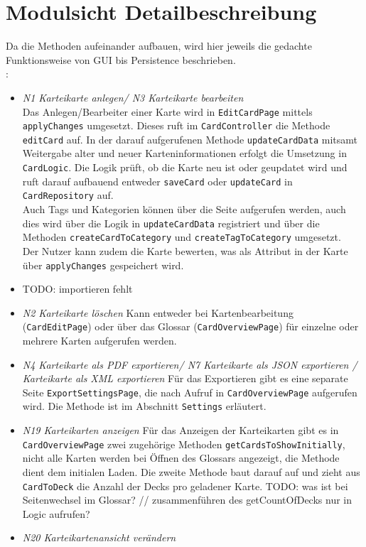 \documentclass[fontsize=12pt,paper=A4,twoside]{scrartcl}
\begin{document}
    \section{Modulsicht Detailbeschreibung}
    Da die Methoden aufeinander aufbauen, wird hier jeweils die gedachte Funktionsweise von GUI bis Persistence beschrieben.\\
    :
    \begin{itemize}
    \item \textit{N1 Karteikarte anlegen/ N3 Karteikarte bearbeiten}\\ Das Anlegen/Bearbeiter einer Karte wird in \texttt{EditCardPage} mittels \texttt{applyChanges} umgesetzt.
    Dieses ruft im \texttt{CardController} die Methode \texttt{editCard} auf. In der darauf aufgerufenen Methode
    \texttt{updateCardData} mitsamt Weitergabe alter und neuer Karteninformationen erfolgt die Umsetzung in \texttt{CardLogic}.
    Die Logik prüft, ob die Karte neu ist oder geupdatet wird und ruft darauf aufbauend entweder \texttt{saveCard} oder \texttt{updateCard}
    in \texttt{CardRepository} auf.\\
    Auch Tags und Kategorien können über die Seite aufgerufen werden, auch dies wird über die Logik in \texttt{updateCardData} registriert und über die Methoden
    \texttt{createCardToCategory} und \texttt{createTagToCategory} umgesetzt.\\
    Der Nutzer kann zudem die Karte bewerten, was als Attribut in der Karte über \texttt{applyChanges} gespeichert wird.
    \item TODO: importieren fehlt
    \item \textit{N2 Karteikarte löschen} Kann entweder bei Kartenbearbeitung (\texttt{CardEditPage}) oder über das Glossar (\texttt{CardOverviewPage})
    für einzelne oder mehrere Karten aufgerufen werden.
    \item \textit{N4 Karteikarte als PDF exportieren/ N7 Karteikarte als JSON exportieren / Karteikarte als XML exportieren} Für das Exportieren gibt es eine separate Seite \texttt{ExportSettingsPage}, die nach Aufruf
    in \texttt{CardOverviewPage} aufgerufen wird. Die Methode ist im Abschnitt \texttt{Settings} erläutert.
    \item \textit{N19 Karteikarten anzeigen} Für das Anzeigen der Karteikarten gibt es in \texttt{CardOverviewPage} zwei zugehörige Methoden
    \texttt{getCardsToShowInitially}, nicht alle Karten werden bei Öffnen
    des Glossars angezeigt, die Methode dient dem initialen Laden. Die zweite Methode baut darauf auf und zieht aus \texttt{CardToDeck} die Anzahl der
    Decks pro geladener Karte. TODO: was ist bei Seitenwechsel im Glossar? // zusammenführen des getCountOfDecks nur in Logic aufrufen?
    \item \textit{N20 Karteikartenansicht verändern}



    \end{itemize}
     \newpage
    \recalctypearea
\end{document}

